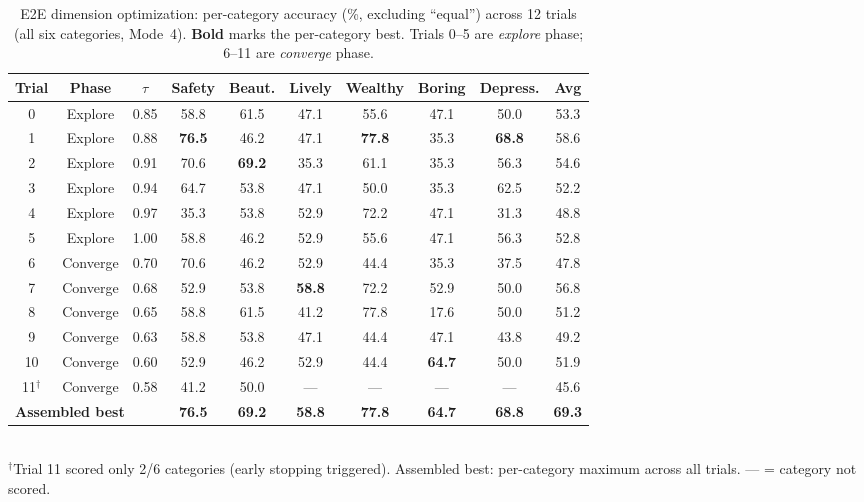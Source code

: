 \documentclass[runningheads]{llncs}
\begin{document}
\begin{table}[H]
\centering
\caption{E2E dimension optimization: per-category accuracy (\%, excluding ``equal'') across 12 trials (all six categories, Mode~4). \textbf{Bold} marks the per-category best. Trials 0--5 are \emph{explore} phase; 6--11 are \emph{converge} phase.}
\label{tab:e2e}
\small
\setlength{\tabcolsep}{3.5pt}
\begin{tabular}{cccccccccc}
\toprule
Trial & Phase & $\tau$ & Safety & Beaut. & Lively & Wealthy & Boring & Depress. & Avg \\
\midrule
0  & Explore  & 0.85 & 58.8 & 61.5 & 47.1 & 55.6 & 47.1 & 50.0 & 53.3 \\
1  & Explore  & 0.88 & \textbf{76.5} & 46.2 & 47.1 & \textbf{77.8} & 35.3 & \textbf{68.8} & 58.6 \\
2  & Explore  & 0.91 & 70.6 & \textbf{69.2} & 35.3 & 61.1 & 35.3 & 56.3 & 54.6 \\
3  & Explore  & 0.94 & 64.7 & 53.8 & 47.1 & 50.0 & 35.3 & 62.5 & 52.2 \\
4  & Explore  & 0.97 & 35.3 & 53.8 & 52.9 & 72.2 & 47.1 & 31.3 & 48.8 \\
5  & Explore  & 1.00 & 58.8 & 46.2 & 52.9 & 55.6 & 47.1 & 56.3 & 52.8 \\
\midrule
6  & Converge & 0.70 & 70.6 & 46.2 & 52.9 & 44.4 & 35.3 & 37.5 & 47.8 \\
7  & Converge & 0.68 & 52.9 & 53.8 & \textbf{58.8} & 72.2 & 52.9 & 50.0 & 56.8 \\
8  & Converge & 0.65 & 58.8 & 61.5 & 41.2 & 77.8 & 17.6 & 50.0 & 51.2 \\
9  & Converge & 0.63 & 58.8 & 53.8 & 47.1 & 44.4 & 47.1 & 43.8 & 49.2 \\
10 & Converge & 0.60 & 52.9 & 46.2 & 52.9 & 44.4 & \textbf{64.7} & 50.0 & 51.9 \\
11$^\dagger$ & Converge & 0.58 & 41.2 & 50.0 & --- & --- & --- & --- & 45.6 \\
\midrule
\multicolumn{3}{l}{\textbf{Assembled best}} & \textbf{76.5} & \textbf{69.2} & \textbf{58.8} & \textbf{77.8} & \textbf{64.7} & \textbf{68.8} & \textbf{69.3} \\
\bottomrule
\end{tabular}
\\[4pt]
\footnotesize{$^\dagger$Trial 11 scored only 2/6 categories (early stopping triggered). Assembled best: per-category maximum across all trials. --- = category not scored.}
\end{table}
\end{document}
